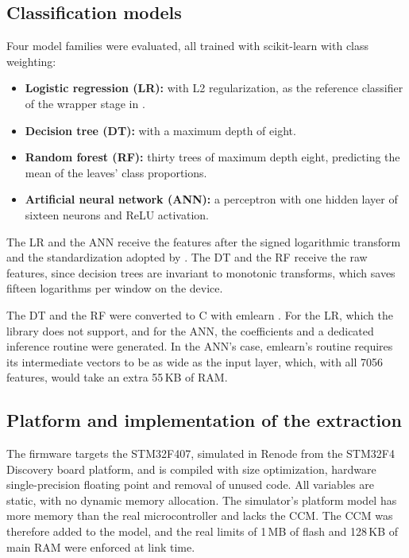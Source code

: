\documentclass[11pt,a4paper]{article}
\begin{document}
\subsection{Classification models}
Four model families were evaluated, all trained with scikit-learn \citep{[52]} with class weighting:
\begin{itemize}
    \item \textbf{Logistic regression (LR):} with L2 regularization, as the reference classifier of the wrapper stage in \citet{martins_tcc_en}.
    \item \textbf{Decision tree (DT):} with a maximum depth of eight.
    \item \textbf{Random forest (RF):} thirty trees of maximum depth eight, predicting the mean of the leaves' class proportions.
    \item \textbf{Artificial neural network (ANN):} a perceptron with one hidden layer of sixteen neurons and ReLU activation.
\end{itemize}

The LR and the ANN receive the features after the signed logarithmic transform and the standardization adopted by \citet{martins_tcc_en}. The DT and the RF receive the raw features, since decision trees are invariant to monotonic transforms, which saves fifteen logarithms per window on the device.

The DT and the RF were converted to C with emlearn \citep{nordby_emlearn}. For the LR, which the library does not support, and for the ANN, the coefficients and a dedicated inference routine were generated. In the ANN's case, emlearn's routine requires its intermediate vectors to be as wide as the input layer, which, with all 7056 features, would take an extra 55\,KB of RAM.

\subsection{Platform and implementation of the extraction}
\label{sec:implementation}
The firmware targets the STM32F407, simulated in Renode from the STM32F4 Discovery board platform, and is compiled with size optimization, hardware single-precision floating point and removal of unused code. All variables are static, with no dynamic memory allocation. The simulator's platform model has more memory than the real microcontroller and lacks the CCM. The CCM was therefore added to the model, and the real limits of 1\,MB of flash and 128\,KB of main RAM were enforced at link time.
\end{document}
